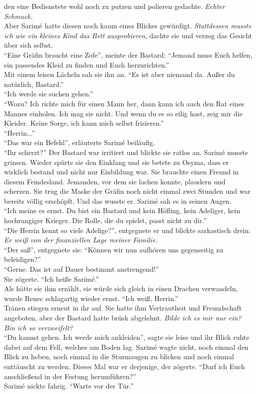 den eine Bedienstete wohl noch zu putzen und polieren gedachte. \textit{Echter Schmuck.}\\
Aber Sarimé hatte diesen noch kaum eines Blickes gewürdigt. \textit{Stattdessen musste ich wie ein 
kleines Kind das Bett ausprobieren}, dachte sie und verzog das Gesicht über sich selbst.\\
``Eine Gräfin braucht eine Zofe'', meinte der Bastard: ``Jemand muss Euch helfen, ein passendes 
Kleid zu finden und Euch herzurichten.''\\
Mit einem leisen Lächeln sah sie ihn an. ``Es ist aber niemand da. Außer du natürlich, Bastard.''\\
``Ich werde sie suchen gehen.''\\
``Wozu? Ich richte mich für einen Mann her, dann kann ich auch den Rat eines Mannes einholen. Ich 
mag sie nicht. Und wenn du es so eilig hast, zeig mir die Kleider. Keine Sorge, ich kann mich 
selbst frisieren.''\\
``Herrin...''\\
``Das war ein Befehl'', erläuterte Sarimé beiläufig. \\
``Ihr scherzt?'' Der Bastard war irritiert und blickte sie ratlos an. Sarimé musste grinsen. Wieder 
spürte sie den Einklang und sie betete zu Osyma, dass er wirklich bestand und nicht nur Einbildung 
war. Sie brauchte einen Freund in diesem Feindesland. Jemanden, vor dem sie lachen konnte, plaudern 
und scherzen. Sie trug die Maske der Gräfin noch nicht einmal zwei Stunden und war bereits völlig 
erschöpft. Und das wusste er. Sarimé sah es in seinen Augen. \\
``Ich meine es ernst. Du bist ein Bastard und kein Höfling, kein Adeliger, kein hochrangiger 
Krieger. Die Rolle, die du spielst, passt nicht zu dir.''\\
``Die Herrin kennt so viele Adelige?'', entgegnete er und blickte sarkastisch drein.\\
\textit{Er weiß von der finanziellen Lage meiner Familie.}\\ 
``Der saß'', entgegnete sie: ``Können wir nun aufhören uns gegenseitig zu beleidigen?''\\
``Gerne. Das ist auf Dauer bestimmt anstrengend!''\\
Sie zögerte. ``Ich heiße Sarimé.''\\
Als hätte sie ihm erzählt, sie würde sich gleich in einen Drachen verwandeln, wurde Renec 
schlagartig wieder ernst. ``Ich weiß, Herrin.''\\
Tränen stiegen erneut in ihr auf. Sie hatte ihm Vertrautheit und Freundschaft angeboten, aber der 
Bastard hatte brüsk abgelehnt. \textit{Bilde ich es mir nur ein? Bin ich so 
verzweifelt?}\\
``Du kannst gehen. Ich werde mich ankleiden'', sagte sie leise und ihr Blick ruhte dabei auf 
dem Fell, welches am Boden lag. Sarimé wagte nicht, noch einmal den Blick zu heben, noch einmal in 
die Sturmaugen zu blicken und noch einmal enttäuscht zu werden. Dieses Mal war er derjenige, der 
zögerte. ``Darf ich Euch anschließend in der Festung herumführen?''\\
Sarimé nickte fahrig. ``Warte vor der Tür.''\\


